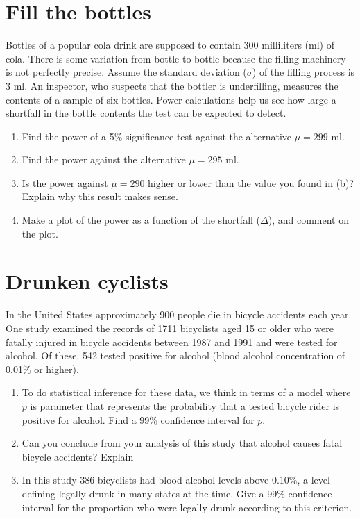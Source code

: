 \documentclass[letterpaper,9pt,twoside,printwatermark=false]{pinp}
\providecommand{\tightlist}{%
  \setlength{\itemsep}{0pt}\setlength{\parskip}{0pt}}
\begin{document}
\section{Fill the bottles}\label{fill-the-bottles}

Bottles of a popular cola drink are supposed to contain 300 milliliters
(ml) of cola. There is some variation from bottle to bottle because the
filling machinery is not perfectly precise. Assume the standard
deviation (\(\sigma\)) of the filling process is 3 ml. An inspector, who
suspects that the bottler is underfilling, measures the contents of a
sample of six bottles. Power calculations help us see how large a
shortfall in the bottle contents the test can be expected to detect.

\begin{enumerate}
\def\labelenumi{\alph{enumi}.}
\tightlist
\item
  Find the power of a 5\% significance test against the alternative
  \(\mu= 299\) ml.
\item
  Find the power against the alternative \(\mu = 295\) ml.
\item
  Is the power against \(\mu = 290\) higher or lower than the value you
  found in (b)? Explain why this result makes sense.
\item
  Make a plot of the power as a function of the shortfall (\(\Delta\)),
  and comment on the plot.
\end{enumerate}

\section{Drunken cyclists}\label{drunken-cyclists}

In the United States approximately 900 people die in bicycle accidents
each year. One study examined the records of 1711 bicyclists aged 15 or
older who were fatally injured in bicycle accidents between 1987 and
1991 and were tested for alcohol. Of these, 542 tested positive for
alcohol (blood alcohol concentration of 0.01\% or higher).

\begin{enumerate}
\def\labelenumi{\alph{enumi}.}
\tightlist
\item
  To do statistical inference for these data, we think in terms of a
  model where \(p\) is parameter that represents the probability that a
  tested bicycle rider is positive for alcohol. Find a 99\% confidence
  interval for \(p\).
\item
  Can you conclude from your analysis of this study that alcohol causes
  fatal bicycle accidents? Explain
\item
  In this study 386 bicyclists had blood alcohol levels above 0.10\%, a
  level defining legally drunk in many states at the time. Give a 99\%
  confidence interval for the proportion who were legally drunk
  according to this criterion.
\end{enumerate}
\end{document}
